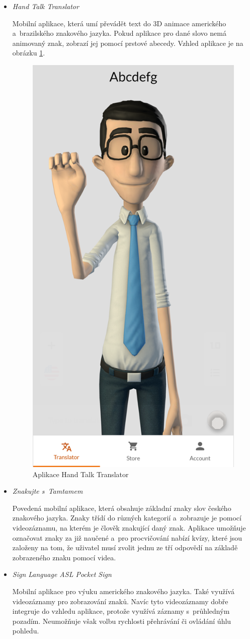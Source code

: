 \documentclass[
  master,
  program=ainfvs,
  biblatex,
  figures=true,
  tables=false,
  sourcecodes=true,
  glossaries,
  index
]{kidiplom}
\begin{document}
        \begin{itemize}
        \item \emph{Hand Talk Translator} \par
                Mobilní aplikace, která umí převádět text do 3D animace amerického a~brazilského znakového jazyka. Pokud aplikace pro dané slovo nemá animovaný znak, zobrazí jej pomocí prstové abecedy. Vzhled aplikace je na obrázku \ref{hand-talk-translator}. \cite{handtalk}
    
                \begin{figure}[htbp]
                    \centering
                    \includegraphics[width=0.25\columnwidth]{graphics/hand-talk-translator.png}
                    \caption{Aplikace Hand Talk Translator}
                    \label{hand-talk-translator}
                \end{figure}
                
            \item \emph{Znakujte s~Tamtamem} \par
                Povedená mobilní aplikace, která obsahuje základní znaky slov českého znakového jazyka. Znaky třídí do různých kategorií a~zobrazuje je pomocí videozáznamu, na kterém je člověk znakující daný znak. Aplikace umožňuje označovat znaky za již naučené a~pro procvičování nabízí kvízy, které jsou založeny na tom, že uživatel musí zvolit jednu ze tří odpovědí na základě zobrazeného znaku pomocí videa. \cite{tamtam}                

            \item \emph{Sign Language ASL Pocket Sign} \par
                Mobilní aplikace pro výuku amerického znakového jazyka. Také využívá videozáznamy pro zobrazování znaků. Navíc tyto videozáznamy dobře integruje do vzhledu aplikace, protože využívá záznamy s~průhledným pozadím. Neumožňuje však volbu rychlosti přehrávání či ovládání úhlu pohledu. \cite{pocket-sign}
             

\end{itemize}
\end{document}
